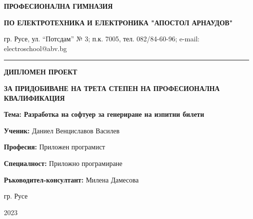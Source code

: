 \addtocounter{page}{-1}

\begin{center}
\begin{footnotesize}
\textbf{ПРОФЕСИОНАЛНА ГИМНАЗИЯ}

\textbf{ПО ЕЛЕКТРОТЕХНИКА И ЕЛЕКТРОНИКА "АПОСТОЛ АРНАУДОВ"}

гр. Русе, ул. “Потсдам” № 3; п.к. 7005, тел. 082/84-60-96;  e-mail:  electroschool@abv.bg
\end{footnotesize}
\end{center}

\par\noindent\rule{\textwidth}{0.4pt}

\hfill \break

\begin{center}

\begin{huge}
\textbf{ДИПЛОМЕН ПРОЕКТ}
\end{huge}

\hfill

\begin{small}
\textbf{ЗА ПРИДОБИВАНЕ НА ТРЕТА СТЕПЕН НА ПРОФЕСИОНАЛНА КВАЛИФИКАЦИЯ}
\end{small}

\hfill \break

\hfill \break

\hfill \break

\hfill \break

\hfill \break

\begin{LARGE}
\textbf{Тема: Разработка на софтуер за генериране на изпитни билети}
\end{LARGE}

\end{center}

\vspace*{\fill}

\textbf{Ученик:}
Даниел Венциславов Василев

\textbf{Професия:}
Приложен програмист

\textbf{Специалност:}
Приложно програмиране

\hfill

\textbf{Ръководител-консултант:}
Милена Дамесова

\hfill

\hfill

\begin{center}
гр. Русе

2023
\end{center}

\thispagestyle{empty}
